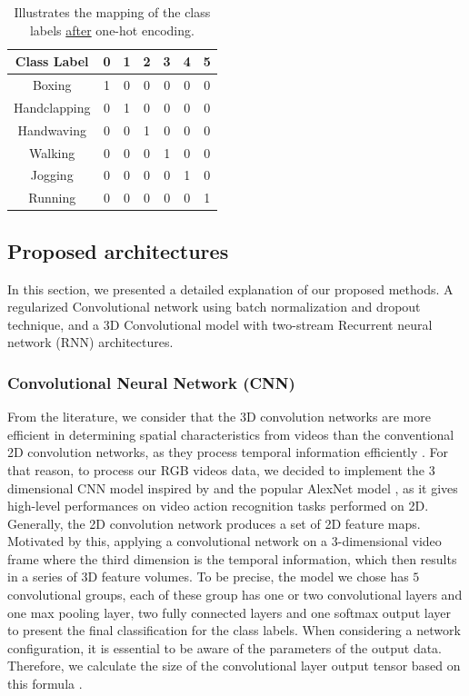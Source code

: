 \documentclass{vldb}
\begin{document}
\begin{table}[ht]
\centering
\caption{Illustrates the mapping of the class labels \underline{after} one-hot encoding.}
\begin{tabular}{|c|c|c|c|c|c|c|}
\hline
\textbf{Class Label} & \textbf{0} & \textbf{1} & \textbf{2} & \textbf{3} & \textbf{4} & \textbf{5} \\ \hline
Boxing & 1 & 0 & 0 & 0 & 0 & 0 \\ \hline
Handclapping & 0 & 1 & 0 & 0 & 0 & 0 \\ \hline
Handwaving & 0 & 0 & 1 & 0 & 0 & 0 \\ \hline
Walking & 0 & 0 & 0 & 1 & 0 & 0 \\ \hline
Jogging & 0 & 0 & 0 & 0 & 1 & 0 \\ \hline
Running & 0 & 0 & 0 & 0 & 0 & 1 \\ \hline
\end{tabular}
\label{onehotencodingafter}
\end{table}\hfill

\subsection{Proposed architectures}
In this section, we presented a detailed explanation of our proposed methods. A regularized Convolutional network using batch normalization and dropout technique, and a 3D Convolutional model with two-stream Recurrent neural network (RNN) architectures.

\subsubsection{Convolutional Neural Network (CNN)}
From the literature, we consider that the 3D convolution networks are more efficient in determining spatial characteristics from videos than the conventional 2D convolution networks, as they process temporal information efficiently \cite{kim20183dsrnet}. For that reason, to process our RGB videos data, we decided to implement the 3 dimensional CNN model inspired by \cite{tran2015learning} and the popular AlexNet model \cite{krizhevsky2012imagenet}, as it gives high-level performances on video action recognition tasks performed on 2D. Generally, the 2D convolution network produces a set of 2D feature maps. Motivated by this, applying a convolutional network on a 3-dimensional video frame where the third dimension is the temporal information, which then results in a series of 3D feature volumes.
To be precise, the model we chose has $5$ convolutional groups, each of these group has one or two convolutional layers and one max pooling layer, two fully connected layers and one softmax output layer to present the final classification for the class labels. When considering a network configuration, it is essential to be aware of the parameters of the output data. Therefore, we calculate the size of the convolutional layer output tensor based on this formula \cite{schmidhuber2015deep}. 
\end{document}
